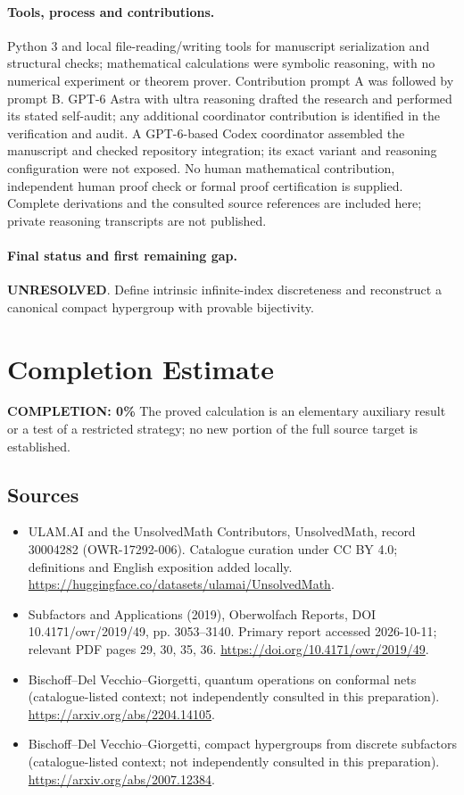 \documentclass[11pt]{article}
\begin{document}
\paragraph{Tools, process and contributions.}
Python 3 and local file-reading/writing tools for manuscript serialization and structural checks; mathematical calculations were symbolic reasoning, with no numerical experiment or theorem prover. Contribution prompt A was followed by prompt B. GPT-6 Astra with ultra reasoning drafted the research and performed its stated self-audit; any additional coordinator contribution is identified in the verification and audit. A GPT-6-based Codex coordinator assembled the manuscript and checked repository integration; its exact variant and reasoning configuration were not exposed. No human mathematical contribution, independent human proof check or formal proof certification is supplied. Complete derivations and the consulted source references are included here; private reasoning transcripts are not published.

\paragraph{Final status and first remaining gap.}
\textbf{UNRESOLVED}. Define intrinsic infinite-index discreteness and reconstruct a canonical compact hypergroup with provable bijectivity.

\section{Completion Estimate}
\noindent\textbf{COMPLETION: 0\%}
The proved calculation is an elementary auxiliary result or a test of a restricted strategy; no new portion of the full source target is established.

\subsection{Sources}
\begin{itemize}
\item[\hypertarget{source:30004282:1}{S1}] ULAM.AI and the UnsolvedMath Contributors, UnsolvedMath, record 30004282 (OWR-17292-006). Catalogue curation under CC BY 4.0; definitions and English exposition added locally.
\url{https://huggingface.co/datasets/ulamai/UnsolvedMath}.
\item[\hypertarget{source:30004282:2}{S2}] Subfactors and Applications (2019), Oberwolfach Reports, DOI 10.4171/owr/2019/49, pp. 3053--3140. Primary report accessed 2026-10-11; relevant PDF pages 29, 30, 35, 36.
\url{https://doi.org/10.4171/owr/2019/49}.
\item[\hypertarget{source:30004282:3}{S3}] Bischoff--Del Vecchio--Giorgetti, quantum operations on conformal nets (catalogue-listed context; not independently consulted in this preparation).
\url{https://arxiv.org/abs/2204.14105}.
\item[\hypertarget{source:30004282:4}{S4}] Bischoff--Del Vecchio--Giorgetti, compact hypergroups from discrete subfactors (catalogue-listed context; not independently consulted in this preparation).
\url{https://arxiv.org/abs/2007.12384}.
\end{itemize}
\label{end:30004282}
\end{document}
